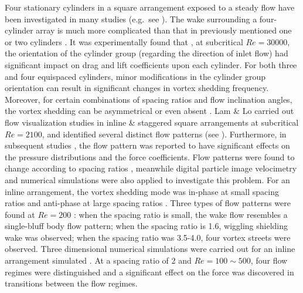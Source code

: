 Four stationary cylinders in a square arrangement exposed to a steady flow have been investigated in many studies (e.g.\ see ). The wake surrounding a four-cylinder array is much more complicated than that in previously mentioned one or two cylinders \cite{Lam2003}. It was experimentally found that \cite{Sayers1988}, at subcritical $ Re=30000 $, the orientation of the cylinder group (regarding the direction of inlet flow) had significant impact on drag and lift coefficients upon each cylinder. For both three and four equispaced cylinders, minor modifications in the cylinder group orientation can result in significant changes in vortex shedding frequency. Moreover, for certain combinations of spacing ratios and flow inclination angles, the vortex shedding can be asymmetrical or even absent \cite{Sayers1990}. Lam \& Lo \cite{Lam1992} carried out flow visualization studies in inline \& staggered square arrangements at subcritical $ Re=2100 $, and identified several distinct flow patterns (see ). Furthermore, in subsequent studies \cite{lam1995effect, Lam2003, lam2003force}, the flow pattern was reported to have significant effects on the pressure distributions and the force coefficients. Flow patterns were found to change according to spacing ratios \cite{Lam2010,Lam2009}, meanwhile digital particle image velocimetry and numerical simulations were also applied to investigate this problem. For an inline arrangement, the vortex shedding mode was in-phase at small spacing ratios and anti-phase at large spacing ratios \cite{Farrant2000a}. Three types of flow patterns were found at $ Re = 200 $ \cite{Han2013}: when the spacing ratio is small, the wake flow resembles a single-bluff body flow pattern; when the spacing ratio is 1.6, wiggling shielding wake was observed; when the spacing ratio was 3.5-4.0, four vortex streets were observed. Three dimensional numerical simulations were carried out for an inline arrangement simulated \cite{Tong2014}. At a spacing ratio of 2 and $ Re=100 \sim 500 $, four flow regimes were distinguished and a significant effect on the force was discovered in transitions between the flow regimes.

